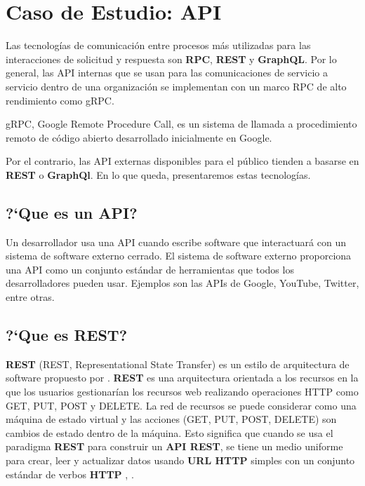 \section{Caso de Estudio: API}

Las tecnologías de comunicación entre procesos más utilizadas para las interacciones de solicitud y respuesta son \textbf{RPC}, \textbf{REST} y \textbf{GraphQL}. Por lo general, las API internas que se usan para las comunicaciones de servicio a servicio dentro de una organización se implementan con un marco RPC de alto rendimiento como gRPC.



 \begin{tcolorbox}
	[colback=green!5!white,colframe=green!75!black,fonttitle=\bfseries, title=gRPC]
	gRPC, Google Remote Procedure Call,  es un sistema de llamada a procedimiento remoto de código abierto desarrollado inicialmente en Google.
\end{tcolorbox}

Por el contrario, las API externas disponibles para el público tienden a basarse en \textbf{REST}  o \textbf{GraphQl}. En lo que queda, presentaremos estas tecnolog\'ias.

\subsection{ ?`Que es un API?}
 
Un desarrollador usa una \gls{API} cuando escribe software que interactuará con un sistema de software externo cerrado. El sistema de software externo proporciona una API como un conjunto estándar de herramientas que todos los desarrolladores pueden usar. Ejemplos  son las APIs de  Google,  YouTube, Twitter, entre otras. 

\subsection{ ?`Que es REST?}

\textbf{REST} (REST, Representational State Transfer) es un estilo de arquitectura de software propuesto por \cite{Fielding2000}. 
\textbf{REST} es una arquitectura orientada a los recursos en la que los usuarios gestionarían los recursos web realizando operaciones HTTP como GET, PUT, POST y DELETE. La red de recursos se puede considerar como una máquina de estado virtual y las acciones (GET, PUT, POST, DELETE) son cambios de estado dentro de la máquina. 
Esto significa  que cuando se usa el paradigma \textbf{REST} para construir un \textbf{API REST}, se tiene un medio uniforme para crear, leer y actualizar datos usando \textbf{URL HTTP} simples con un conjunto estándar de verbos \textbf{HTTP} \cite{Satheesh2015}, \cite{Erl2013}.

